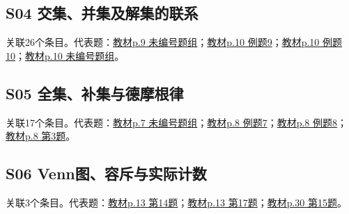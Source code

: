 \par\medskip\noindent\begin{minipage}{\linewidth}\subsection{S04 交集、并集及解集的联系}关联26个条目。代表题：\hyperref[XJ-B1-C01-TH-P009-Y0951]{教材p.9 未编号题组}；\hyperref[XJ-B1-C01-EX-P010-Y0276]{教材p.10 例题9}；\hyperref[XJ-B1-C01-EX-P010-Y0596]{教材p.10 例题10}；\hyperref[XJ-B1-C01-TH-P010-Y1233]{教材p.10 未编号题组}。\end{minipage}\par
\par\medskip\noindent\begin{minipage}{\linewidth}\subsection{S05 全集、补集与德摩根律}关联17个条目。代表题：\hyperref[XJ-B1-C01-TH-P007-Y1130]{教材p.7 未编号题组}；\hyperref[XJ-B1-C01-EX-P008-Y0280]{教材p.8 例题7}；\hyperref[XJ-B1-C01-EX-P008-Y0515]{教材p.8 例题8}；\hyperref[XJ-B1-C01-PR-P008-Y1092]{教材p.8 第3题}。\end{minipage}\par
\par\medskip\noindent\begin{minipage}{\linewidth}\subsection{S06 Venn图、容斥与实际计数}关联3个条目。代表题：\hyperref[XJ-B1-C01-HW-P013-Y1051]{教材p.13 第14题}；\hyperref[XJ-B1-C01-HW-P013-Y1531]{教材p.13 第17题}；\hyperref[XJ-B1-C01-RV-P030-Y0883]{教材p.30 第15题}。\end{minipage}\par
